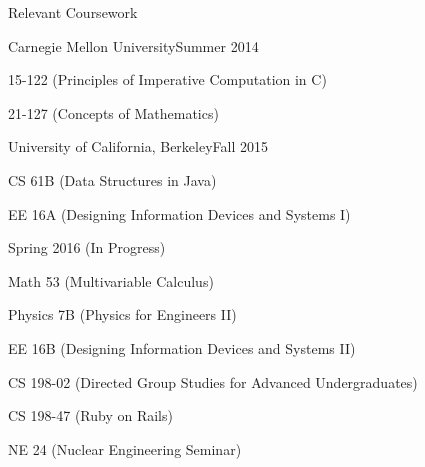\documentclass{resume} %
\begin{document}
\pagebreak

\begin{rSection}{Relevant Coursework}

\begin{rSubsection}{Carnegie Mellon University}{}{Summer 2014}{}
\item 15-122 (Principles of Imperative Computation in C)
\item 21-127 (Concepts of Mathematics)
\end{rSubsection}

\begin{rSubsection}{University of California, Berkeley}{}{Fall 2015}{}
\item CS 61B (Data Structures in Java)
\item EE 16A (Designing Information Devices and Systems I)
\end{rSubsection}
\begin{rSubsection}{}{}{Spring 2016 (In Progress)}{}
\item Math 53 (Multivariable Calculus)
\item Physics 7B (Physics for Engineers II)
\item EE 16B (Designing Information Devices and Systems II)
\item CS 198-02 (Directed Group Studies for Advanced Undergraduates)
\item CS 198-47 (Ruby on Rails)
\item NE 24 (Nuclear Engineering Seminar)
\end{rSubsection}

\end{rSection}






\end{document}

